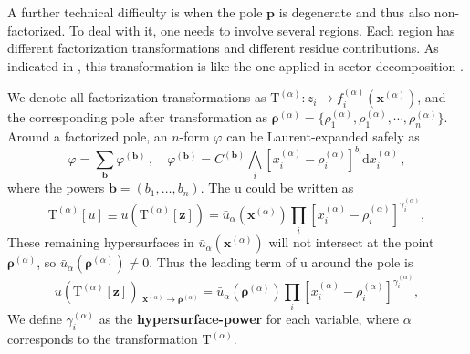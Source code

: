 \documentclass[a4paper,11pt]{article}
\newcommand{\nd}{\mathrm{d}}
\newcommand{\nT}{\mathrm{T}}
\begin{document}
A further technical difficulty is when the pole $\bm{p}$ is degenerate and thus also non-factorized. To deal with it, 
one needs to involve several regions. Each region has different factorization transformations and different residue contributions. 
As indicated in \cite{Chestnov:2022xsy}, this transformation is like the one  applied in sector decomposition \cite{Binoth:2000ps, Binoth:2003ak, Binoth:2004jv, Heinrich:2008si}.




 We denote all factorization transformations as $\nT^{(\alpha)}: z_i \to f^{(\alpha)}_i(\bm{x}^{(\alpha)})$, and the corresponding pole after transformation as $\bm{\rho}^{(\alpha)}=\{\rho^{(\alpha)}_1,\rho^{(\alpha)}_1,\cdots,\rho^{(\alpha)}_n\}$. Around a factorized pole, an $n$-form $\varphi$ can be Laurent-expanded safely  as
\begin{equation}
  \varphi= \sum_{\bm{b}} \varphi^{(\bm{b})}\,, \quad  \varphi^{(\bm{b})} = C^{(\bm{b})} \bigwedge_i  \left[ x_i^{(\alpha)} - \rho_i^{(\alpha)} \right]^{b_{i}} \nd x^{(\alpha)}_i \,,  \label{eq:phib}
\end{equation}
where the powers $\bm{b}=(b_1,\ldots,b_n)$. The u could be written as 
%
\begin{equation}
  \nT^{(\alpha)}\left[u \right]\equiv   u(\nT^{(\alpha)}[\bm{z}]) = \bar{u}_\alpha(\bm{x}^{(\alpha)}) \prod_i \left[ x_i^{(\alpha)} - \rho_i^{(\alpha)} \right]^{\gamma_i^{(\alpha)}} ,
    \label{eq:degenerate-1}
\end{equation}
%
These remaining hypersurfaces in $\bar{u}_\alpha(\bm{x}^{(\alpha)})$  will not intersect at the point $ \bm{\rho}^{(\alpha)}$, so $\bar{u}_\alpha(\bm{\rho}^{(\alpha)})\neq 0$. 
Thus the leading term of u around the pole is
\begin{equation}
    u(\nT^{(\alpha)}[\bm{z}])\big|_{\bm{x}^{(\alpha)} \to \bm{\rho}^{(\alpha)}} = \bar{u}_\alpha(\bm{\rho}^{(\alpha)}) \prod_i \left[ x_i^{(\alpha)} - \rho_i^{(\alpha)} \right]^{\gamma_i^{(\alpha)}} ,
    \label{eq:degenerate}
\end{equation}
We  define  $\gamma^{(\alpha)}_i$ as the {\bf hypersurface-power} for each variable, where $\alpha$  corresponds to the  transformation  $\nT^{(\alpha)}$.
\end{document}
